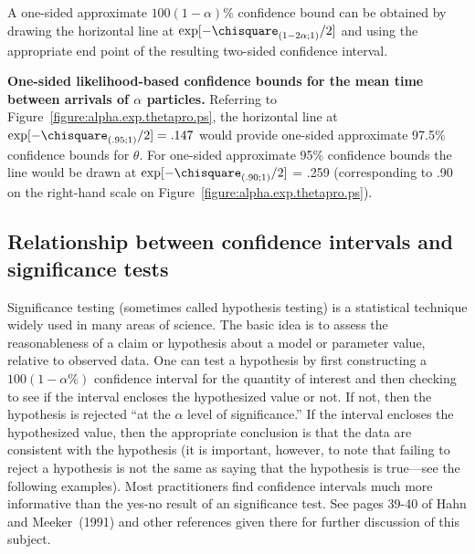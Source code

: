 A one-sided approximate $100(1-\alpha)\%$ confidence bound can be
obtained by drawing the horizontal line at
$\exp[-\chisquare_{(1-2\alpha;1)}/2]$ and using the appropriate end
point of the resulting two-sided confidence interval.

\begin{example}
{\bf One-sided likelihood-based confidence bounds for the mean time
between arrivals of $\alpha$ particles.} 
\label{example:one.sided.lr.exponential}
Referring to Figure~\ref{figure:alpha.exp.thetapro.ps}, the horizontal
line at $\exp[-\chisquare_{(.95;1)}/2] = .147$ would provide one-sided
approximate 97.5\% confidence bounds for $\theta$. For
one-sided approximate 95\% confidence bounds the line would be drawn
at $\exp[-\chisquare_{(.90;1)}/2]$ = .259 (corresponding to .90 on the
right-hand scale on Figure~\ref{figure:alpha.exp.thetapro.ps}).
\end{example}

\subsection{Relationship between confidence 
intervals and significance tests}
\label{section:one.par.ci.hyp.relat}

Significance testing (sometimes called hypothesis testing) is a
statistical technique widely used in many areas of science. The basic
idea is to assess the reasonableness of a claim or hypothesis
about a model or parameter value,
relative to observed data. One can test a hypothesis by first constructing a
$100(1-\alpha\%)$ confidence interval for the quantity of interest and
then checking to see if the interval encloses the hypothesized value 
or not. If not, then the hypothesis is rejected ``at the
$\alpha$ level of significance.'' If the interval encloses the 
hypothesized value, then the appropriate conclusion is that the data are
consistent with the hypothesis (it is important, however, to
note that failing to reject a hypothesis is not the same as saying
that the hypothesis is true---see the following examples).  Most
practitioners find confidence intervals much more informative than the
yes-no result of an significance test. See pages 39-40 of Hahn and
Meeker~(1991) and other references given there for further discussion
of this subject.

